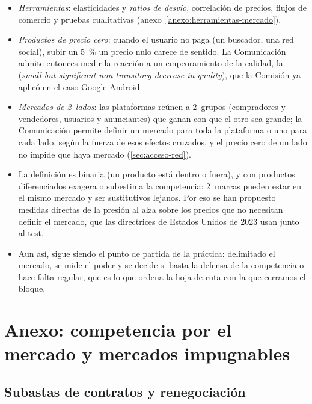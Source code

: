 \documentclass[11pt]{article}
\begin{document}
\begin{itemize}
\item \emph{Herramientas}: elasticidades y \emph{ratios de desvío}, correlación de precios, flujos de comercio y pruebas cualitativas (anexo~\ref{anexo:herramientas-mercado}).
\item \emph{Productos de precio cero}: cuando el usuario no paga (un buscador, una red social), subir un 5~\% un precio nulo carece de sentido. La Comunicación admite entonces medir la reacción a un empeoramiento de la calidad, la  (\emph{small but significant non-transitory decrease in quality}), que la Comisión ya aplicó en el caso Google Android\nocite{CE2024DefinicionMercado}.
\item \emph{Mercados de 2~lados}: las plataformas reúnen a 2~grupos (compradores y vendedores, usuarios y anunciantes) que ganan con que el otro sea grande; la Comunicación permite definir un mercado para toda la plataforma o uno para cada lado, según la fuerza de esos efectos cruzados, y el precio cero de un lado no impide que haya mercado\nocite{CE2024DefinicionMercado} (\ref{sec:acceso-red}).
\item La definición es binaria (un producto está dentro o fuera), y con productos diferenciados exagera o subestima la competencia: 2~marcas pueden estar en el mismo mercado y ser sustitutivos lejanos. Por eso se han propuesto medidas directas de la presión al alza sobre los precios que no necesitan definir el mercado\nocite{FarrellShapiro2010Antitrust}, que las directrices de Estados Unidos de 2023 usan junto al test\nocite{DOJFTC2023Merger}.
\item Aun así, sigue siendo el punto de partida de la práctica: delimitado el mercado, se mide el poder y se decide si basta la defensa de la competencia o hace falta regular, que es lo que ordena la hoja de ruta con la que cerramos el bloque.
\end{itemize}

\section{Anexo: competencia por el mercado\cortetitulo{} y mercados impugnables}\label{anexo:competencia-mercado}

\subsection{Subastas de contratos y renegociación}\label{anexo:subastas-concesiones}
\end{document}
